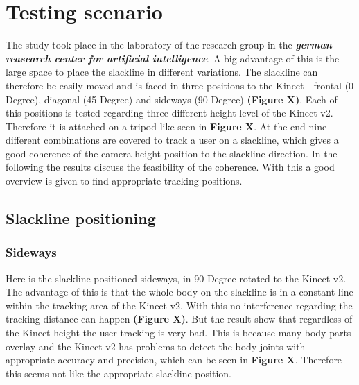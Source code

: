 \section{Testing scenario}

The study took place in the laboratory of the research group in the \textit{\textbf{german reasearch center for artificial intelligence}}. A big advantage of this is the large space to place the slackline in different variations. The slackline can therefore be easily moved and is faced in three positions to the Kinect - frontal (0 Degree), diagonal (45 Degree) and sideways (90 Degree) \textbf{(Figure X)}. Each of this positions is tested regarding three different height level of the Kinect v2. Therefore it is attached on a tripod like seen in \textbf{Figure X}. At the end nine different combinations are covered to track a user on a slackline, which gives a good coherence of the camera height position to the slackline direction. In the following the results discuss the feasibility of the coherence. With this a good overview is given to find appropriate tracking positions.

\subsection{Slackline positioning}
\subsubsection{Sideways}
Here is the slackline positioned sideways, in 90 Degree rotated to the Kinect v2. The advantage of this is that the whole body on the slackline is in a constant line within the tracking area of the Kinect v2. With this no interference regarding the tracking distance can happen \textbf{(Figure X)}. But the result show that regardless of the Kinect height the user tracking is very bad. This is because many body parts overlay and the Kinect v2 has problems to detect the body joints with appropriate accuracy and precision, which can be seen in \textbf{Figure X}. Therefore this seems not like the appropriate slackline position.

